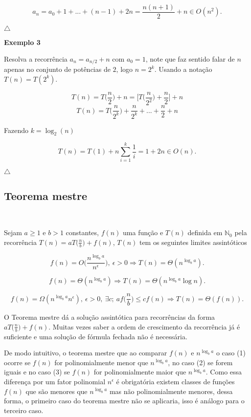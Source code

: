 \[a_n = a_0 + 1 + ... + (n-1) + 2n = \frac{n(n+1)}{2} + n \in O(n^2).\]

{\raggedleft $\bigtriangleup$ \par}

\textbf{Exemplo 3}

Resolva a recorrência $a_n = a_{n/2} + n$ com $a_0 = 1$, note que faz sentido falar de $n$ apenas no conjunto de potências de $2$, logo $n=2^k$. Usando a notação $T(n)=T(2^k)$.

\[T(n) = T \Bigr(\frac{n}{2}\Bigr) + n = \Bigr[T\Bigr(\frac{n}{2^2}\Bigr) + \frac{n}{2}\Bigr] + n\]
\[T(n) = T\Bigr(\frac{n}{2^k}\Bigr) + \frac{n}{2^k} + ... + \frac{n}{2} + n\]

Fazendo $k=\log_2(n)$

\[T(n) = T(1) + n\sum_{i=1}^k \frac{1}{i} = 1 + 2n \in O(n).\]

{\raggedleft $\bigtriangleup$ \par}

\subsection{Teorema mestre}
\

Sejam $a\geq 1$ e $b>1$ constantes, $f(n)$ uma função e $T(n)$ definida em $\mathbb{N}_0$ pela recorrência $T(n) = aT\Bigr(\frac{n}{b}\Bigr) + f(n)$, $T(n)$ tem os seguintes limites assintóticos

\[f(n) = O\Bigr(\frac{n^{\log_ba}}{n^\epsilon}\Bigr), \ \epsilon>0 \Rightarrow T(n) = \Theta(n^{\log_ba}).\]

\[f(n) = \Theta(n^{\log_ba}) \Rightarrow T(n) = \Theta(n^{\log_ba} \log n).\]

\[f(n) = \Omega(n^{\log_ba}n^\epsilon), \ \epsilon>0, \ \exists c; \ af\Bigr(\frac{n}{b}\Bigr)\leq cf(n) \Rightarrow T(n) = \Theta(f(n)).\]


O Teorema mestre dá a solução assintótica para recorrências da forma $aT\Bigr(\frac{n}{b}\Bigr) + f(n)$. Muitas vezes saber a ordem de crescimento da recorrência já é suficiente e uma solução de fórmula fechada não é necessária.

De modo intuitivo, o teorema mestre que ao comparar $f(n)$ e $n^{\log_ba}$ o caso (1) ocorre se $f(n)$ for polinomialmente menor que $n^{\log_ba}$, no caso (2) se forem iguais e no caso (3) se $f(n)$ for polinomialmente maior que $n^{\log_ba}$. Como essa diferença por um fator polinomial $n^\epsilon$ é obrigatória existem classes de funções $f(n)$ que são menores que $n^{\log_ba}$ mas não polinomialmente menores, dessa forma, o primeiro caso do teorema mestre não se aplicaria, isso é análogo para o terceiro caso.


